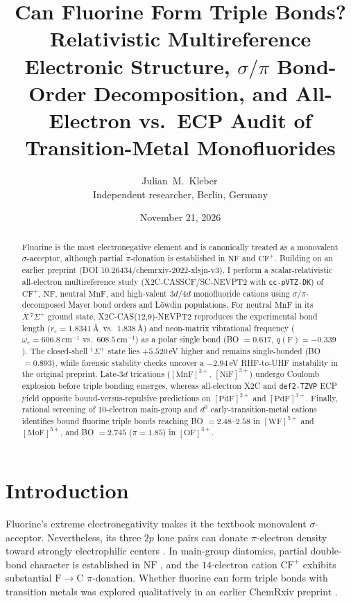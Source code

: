 \documentclass[10pt,twocolumn]{article}
\title{\textbf{Can Fluorine Form Triple Bonds? Relativistic Multireference Electronic Structure, $\sigma/\pi$ Bond-Order Decomposition, and All-Electron vs.\ ECP Audit of Transition-Metal Monofluorides}}
\author{Julian~M.~Kleber\,\orcidlink{0000-0001-5518-0932}\\
\small Independent researcher, Berlin, Germany}
\date{November 21, 2026}
\begin{document}
\maketitle

\begin{abstract}
Fluorine is the most electronegative element and is canonically treated as a monovalent $\sigma$-acceptor, although partial $\pi$-donation is established in $\mathrm{NF}$ and $\mathrm{CF}^+$. Building on an earlier preprint (DOI 10.26434/chemrxiv-2022-xlsjn-v3), I perform a scalar-relativistic all-electron multireference study (X2C-CASSCF/SC-NEVPT2 with \texttt{cc-pVTZ-DK}) of $\mathrm{CF}^+$, $\mathrm{NF}$, neutral $\mathrm{MnF}$, and high-valent $3d$/$4d$ monofluoride cations using $\sigma/\pi$-decomposed Mayer bond orders and L\"owdin populations. For neutral $\mathrm{MnF}$ in its $X\,^7\Sigma^+$ ground state, X2C-CAS(12,9)-NEVPT2 reproduces the experimental bond length ($r_e = 1.8341\,$\AA\ vs.\ $1.838\,$\AA) and neon-matrix vibrational frequency ($\omega_e = 606.8\,\mathrm{cm}^{-1}$ vs.\ $608.5\,\mathrm{cm}^{-1}$) as a polar single bond (BO $= 0.617$, $q(\mathrm{F}) = -0.339$). The closed-shell $^1\Sigma^+$ state lies $+5.520\,$eV higher and remains single-bonded (BO $= 0.893$), while forensic stability checks uncover a $-2.94\,$eV RHF-to-UHF instability in the original preprint. Late-$3d$ trications ($[\mathrm{MnF}]^{3+}$, $[\mathrm{NiF}]^{3+}$) undergo Coulomb explosion before triple bonding emerges, whereas all-electron X2C and \texttt{def2-TZVP} ECP yield opposite bound-versus-repulsive predictions on $[\mathrm{PdF}]^{2+}$ and $[\mathrm{PdF}]^{3+}$. Finally, rational screening of $10$-electron main-group and $d^0$ early-transition-metal cations identifies bound fluorine triple bonds reaching BO $= 2.48$--$2.58$ in $[\mathrm{WF}]^{5+}$ and $[\mathrm{MoF}]^{5+}$, and BO $= 2.745$ ($\pi = 1.85$) in $[\mathrm{OF}]^{3+}$.
\end{abstract}

\section{Introduction}
Fluorine's extreme electronegativity makes it the textbook monovalent $\sigma$-acceptor. Nevertheless, its three $2p$ lone pairs can donate $\pi$-electron density toward strongly electrophilic centers \cite{frenking2000}. In main-group diatomics, partial double-bond character is established in $\mathrm{NF}$ \cite{harbison2002}, and the $14$-electron cation $\mathrm{CF}^+$ exhibits substantial $\mathrm{F}\to\mathrm{C}$ $\pi$-donation. Whether fluorine can form triple bonds with transition metals was explored qualitatively in an earlier ChemRxiv preprint \cite{kleber2025}.
\end{document}
